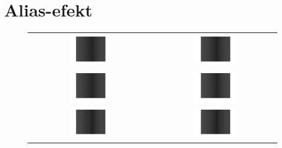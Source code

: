 \documentclass[12pt, a4]{report}
\begin{document}
        \section{Alias-efekt}
            \begin{enumerate}
                \begin{figure}[ht]
                    \centering
                    \begin{tabular}{cc}
                        \includegraphics[width=0.35\textwidth]{sampleL_1} & \includegraphics[width=0.35\textwidth]{sampleL_2} \\
                        \includegraphics[width=0.35\textwidth]{sampleL_3} & \includegraphics[width=0.35\textwidth]{sampleL_4} \\
                        \includegraphics[width=0.35\textwidth]{sampleL_5} & \includegraphics[width=0.35\textwidth]{sampleL_6} \\

\end{tabular}
\end{figure}
\end{enumerate}
\end{document}
